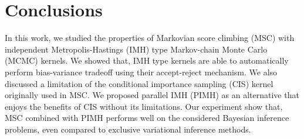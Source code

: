 
\section{Conclusions}
In this work, we studied the properties of Markovian score climbing (MSC) with independent Metropolis-Hastings (IMH) type Markov-chain Monte Carlo (MCMC) kernels.
We showed that, IMH type kernels are able to automatically perform bias-variance tradeoff using their accept-reject mechanism.
We also discussed a limitation of the conditional importance sampling (CIS) kernel originally used in MSC.
We proposed parallel IMH (PIMH) as an alternative that enjoys the benefits of CIS without its limitations.
Our experiment show that, MSC combined with PIMH performs well on the considered Bayesian inference problems, even compared to exclusive variational inference methods.


